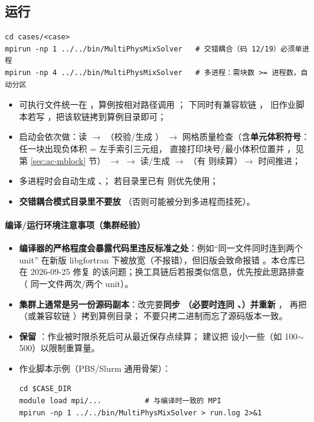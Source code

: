 \subsection{运行}
\begin{lstlisting}
cd cases/<case>
mpirun -np 1 ../../bin/MultiPhysMixSolver   # 交错耦合（码 12/19）必须单进程
mpirun -np 4 ../../bin/MultiPhysMixSolver   # 多进程：需块数 >= 进程数，自动分区
\end{lstlisting}
\begin{itemize}
  \item 可执行文件统一在 ，算例按相对路径调用 ；
         下同时有兼容软链 ，
        旧作业脚本若写 ，把该软链拷到算例目录即可；
  \item 启动会依次做：读  $\to$ （校验/生成 ）
        $\to$ 网格质量检查（含\textbf{单元体积符号}：任一块出现负体积 = 左手索引三元组，
        直接打印块号/最小体积位置并 ，见第 \ref{sec:ac-mblock} 节）
        $\to$  $\to$ 读/生成 
        $\to$ （有  则续算）$\to$ 时间推进；
  \item 多进程时会自动生成 、；
        若目录里已有  则优先使用；
  \item \textbf{交错耦合模式目录里不要放 }（否则可能被分到多进程而挂死）。
\end{itemize}

\paragraph{编译/运行环境注意事项（集群经验）}
\begin{itemize}
  \item \textbf{编译器的严格程度会暴露代码里违反标准之处}：例如“同一文件同时连到两个 unit”
        在新版 libgfortran 下被放宽（不报错），但旧版会致命报错
        。本仓库已在 2026-09-25 修复
         的该问题；换工具链后若报类似信息，优先按此思路排查
        （ 同一文件两次/两个 unit）。
  \item \textbf{集群上通常是另一份源码副本}：改完要\textbf{同步 （必要时连同
        、）并重新 }，
        再把 （或兼容软链 ）拷到算例目录；
        不要只拷二进制而忘了源码版本一致。
  \item \textbf{保留 }：作业被时限杀死后可从最近保存点续算；
        建议把  设小一些（如 100$\sim$500）以限制重算量。
  \item 作业脚本示例（PBS/Slurm 通用骨架）：
\begin{lstlisting}
cd $CASE_DIR
module load mpi/...          # 与编译时一致的 MPI
mpirun -np 1 ../../bin/MultiPhysMixSolver > run.log 2>&1
\end{lstlisting}
\end{itemize}

